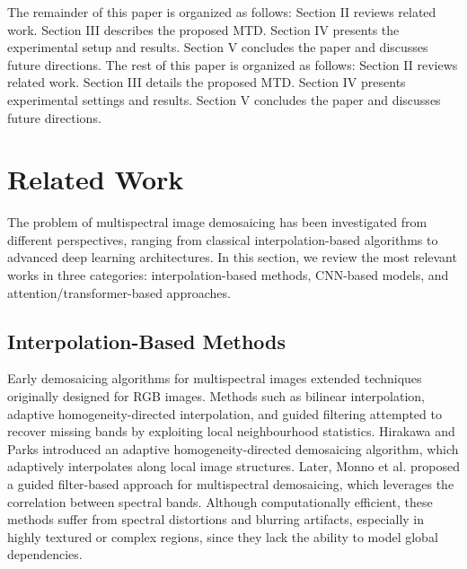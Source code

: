\documentclass[conference]{IEEEtran}
\begin{document}
The remainder of this paper is organized as follows: Section II reviews related work. Section III describes the proposed MTD. Section IV presents the experimental setup and results. Section V concludes the paper and discusses future directions.
The rest of this paper is organized as follows: Section II reviews related work. Section III details the proposed MTD. Section IV presents experimental settings and results. Section V concludes the paper and discusses future directions.

\section{Related Work}
The problem of multispectral image demosaicing has been investigated from different perspectives, ranging from classical interpolation-based algorithms to advanced deep learning architectures. In this section, we review the most relevant works in three categories: interpolation-based methods, CNN-based models, and attention/transformer-based approaches.
\subsection{Interpolation-Based Methods}
Early demosaicing algorithms for multispectral images extended techniques originally designed for RGB images. Methods such as bilinear interpolation, adaptive homogeneity-directed interpolation, and guided filtering attempted to recover missing bands by exploiting local neighbourhood statistics.
Hirakawa and Parks \cite{Hirakawa2005} introduced an adaptive homogeneity-directed demosaicing algorithm, which adaptively interpolates along local image structures. Later, Monno et al. \cite{Zhang2024} proposed a guided filter-based approach for multispectral demosaicing, which leverages the correlation between spectral bands. Although computationally efficient, these methods suffer from spectral distortions and blurring artifacts, especially in highly textured or complex regions, since they lack the ability to model global dependencies.
\end{document}
